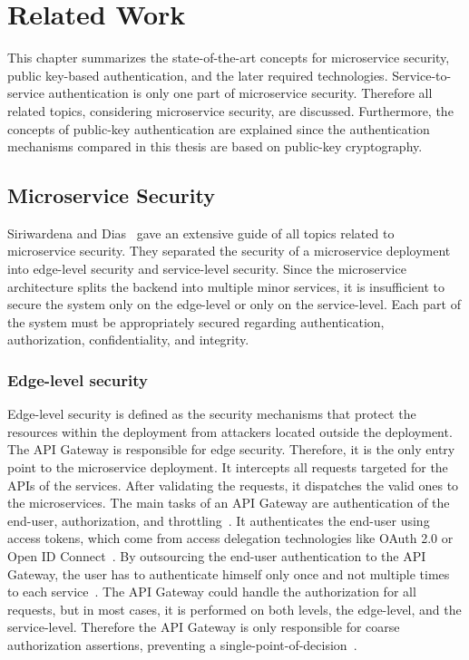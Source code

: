 \chapter{Related Work}
\label{cha:Related_Work}
This chapter summarizes the state-of-the-art concepts for microservice security, public key-based authentication, and the later required technologies.
Service-to-service authentication is only one part of microservice security.
Therefore all related topics, considering microservice security, are discussed.
Furthermore, the concepts of public-key authentication are explained since the authentication mechanisms compared in this thesis are based on public-key cryptography.

\section{Microservice Security}
Siriwardena and Dias~\cite{dias2020microservices} gave an extensive guide of all topics related to microservice security. 
They separated the security of a microservice deployment into edge-level security and service-level security.
Since the microservice architecture splits the backend into multiple minor services, it is insufficient to secure the system only on the edge-level or only on the service-level.
Each part of the system must be appropriately secured regarding authentication, authorization, confidentiality, and integrity.

\subsection{Edge-level security}
Edge-level security is defined as the security mechanisms that protect the resources within the deployment from attackers located outside the deployment. 
The API Gateway is responsible for edge security. 
Therefore, it is the only entry point to the microservice deployment.
It intercepts all requests targeted for the APIs of the services.
After validating the requests, it dispatches the valid ones to the microservices.
The main tasks of an API Gateway are authentication of the end-user, authorization, and throttling~\cite{dias2020microservices}.
It authenticates the end-user using access tokens, which come from access delegation technologies like OAuth 2.0 or Open ID Connect~\cite{siriwardena2014advanced}.
By outsourcing the end-user authentication to the API Gateway, the user has to authenticate himself only once and not multiple times to each service~\cite{dias2020microservices}.
The API Gateway could handle the authorization for all requests, but in most cases, it is performed on both levels, the edge-level, and the service-level. 
Therefore the API Gateway is only responsible for coarse authorization assertions, preventing a single-point-of-decision~\cite{barabanov2020authentication}.

